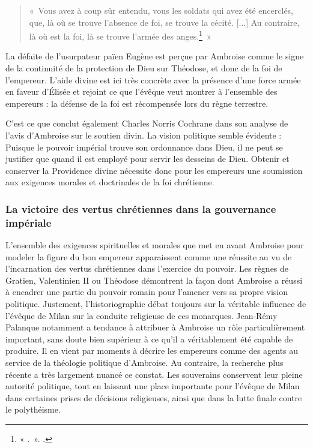 \bigskip

\begin{quote}
«~Vous avez à coup sûr entendu, vous les soldats qui avez été encerclés, que, là où se trouve l’absence de foi, se trouve la cécité. [...] Au contraire, là où est la foi, là se trouve l’armée des anges.\footnote{« .~». \cite[]{ambroise_mort_theodose}.}~»
\end{quote}

\bigskip

La défaite de l’usurpateur païen Eugène est perçue par Ambroise comme le signe de la continuité de la protection de Dieu sur Théodose, et donc de la foi de l’empereur. L'aide divine est ici très concrète avec la présence d'une force armée en faveur d'Élisée et rejoint ce que l'évêque veut montrer à l'ensemble des empereurs : la défense de la foi est récompensée lors du règne terrestre.

\bigskip

C'est ce que conclut également Charles Norris Cochrane dans son analyse de l'avis d'Ambroise sur le soutien divin. La vision politique semble évidente : Puisque le pouvoir impérial trouve son ordonnance dans Dieu, il ne peut se justifier que quand il est employé pour servir les desseins de Dieu\autocite[348]{cochrane_christianity}. Obtenir et conserver la Providence divine nécessite donc pour les empereurs une soumission aux exigences morales et doctrinales de la foi chrétienne.

\bigskip

\subsubsection{La victoire des vertus chrétiennes dans la gouvernance impériale}

L'ensemble des exigences spirituelles et morales que met en avant Ambroise pour modeler la figure du bon empereur apparaissent comme une réussite au vu de l'incarnation des vertus chrétiennes dans l'exercice du pouvoir. Les règnes de Gratien, Valentinien II ou Théodose démontrent la façon dont Ambroise a réussi à encadrer une partie du pouvoir romain pour l'amener vers sa propre vision politique. Justement, l'historiographie débat toujours sur la véritable influence de l'évêque de Milan sur la conduite religieuse de ces monarques. Jean-Rémy Palanque notamment a tendance à attribuer à Ambroise un rôle particulièrement important, sans doute bien supérieur à ce qu'il a véritablement été capable de produire. Il en vient par moments à décrire les empereurs comme des agents au service de la théologie politique d'Ambroise. Au contraire, la recherche plus récente a très largement nuancé ce constat. Les souverains conservent leur pleine autorité politique, tout en laissant une place importante pour l'évêque de Milan dans certaines prises de décisions religieuses, ainsi que dans la lutte finale contre le polythéisme.


